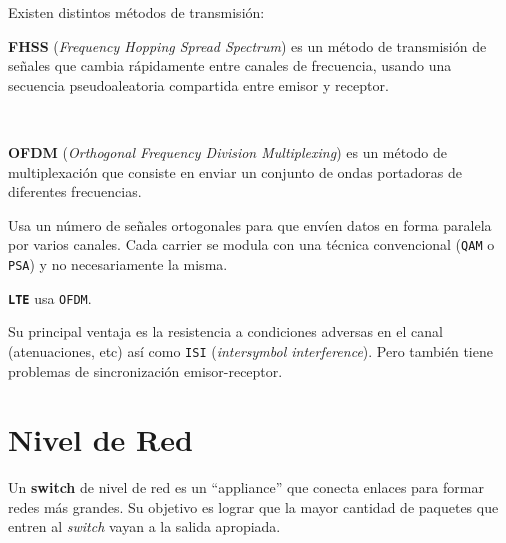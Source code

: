\documentclass[]{article}
\begin{document}
Existen distintos métodos de transmisión:


\textbf{FHSS} (\emph{Frequency Hopping Spread Spectrum}) es un método de transmisión de señales que cambia rápidamente entre canales de frecuencia, usando una secuencia pseudoaleatoria compartida entre emisor y receptor.

~\newline
{}

\textbf{OFDM} (\emph{Orthogonal Frequency Division Multiplexing}) es un método de multiplexación que consiste en enviar un conjunto de ondas portadoras de diferentes frecuencias.

Usa un número de señales ortogonales para que envíen datos en forma paralela por varios canales. Cada carrier se modula con una técnica convencional (\texttt{QAM} o \texttt{PSA}) y no necesariamente la misma.

\texttt{\textbf{LTE}} usa \texttt{OFDM}.

Su principal ventaja es la resistencia a condiciones adversas en el canal (atenuaciones, etc) así como \texttt{ISI} (\emph{intersymbol interference}). Pero también tiene problemas de sincronización emisor-receptor.



\section{Nivel de Red}
Un \textbf{switch} de nivel de red es un ``appliance'' que conecta enlaces para formar redes más grandes. Su objetivo es lograr que la mayor cantidad de paquetes que entren al \emph{switch} vayan a la salida apropiada.
\end{document}
